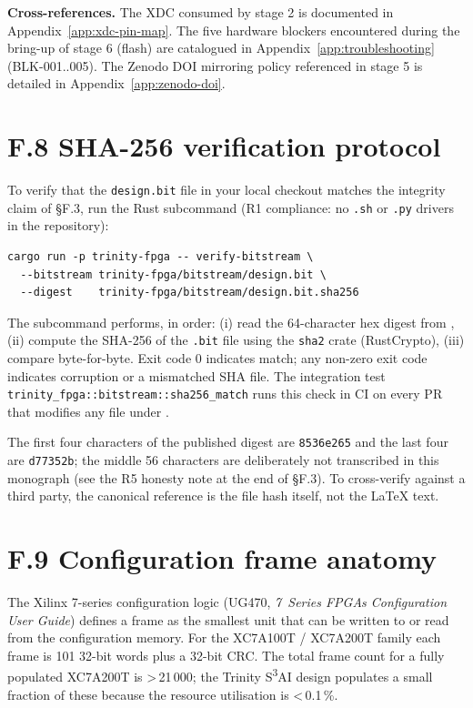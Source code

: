\textbf{Cross-references.}
The XDC consumed by stage 2 is documented in
Appendix~\ref{app:xdc-pin-map}. The five hardware blockers encountered
during the bring-up of stage 6 (flash) are catalogued in
Appendix~\ref{app:troubleshooting} (BLK-001..005). The Zenodo DOI
mirroring policy referenced in stage 5 is detailed in
Appendix~\ref{app:zenodo-doi}.

\section*{F.8 SHA-256 verification protocol}
\label{sec:appF-verify}

To verify that the \texttt{design.bit} file in your local checkout
matches the integrity claim of \S F.3, run the Rust subcommand
(R1 compliance: no \texttt{.sh} or \texttt{.py} drivers in the
repository):

\begin{verbatim}
cargo run -p trinity-fpga -- verify-bitstream \
  --bitstream trinity-fpga/bitstream/design.bit \
  --digest    trinity-fpga/bitstream/design.bit.sha256
\end{verbatim}

The subcommand performs, in order: (i) read the 64-character hex digest
from , (ii) compute the SHA-256 of the
\texttt{.bit} file using the \texttt{sha2} crate (RustCrypto), (iii)
compare byte-for-byte. Exit code 0 indicates match; any non-zero exit
code indicates corruption or a mismatched SHA file. The integration
test \texttt{trinity\_fpga::bitstream::sha256\_match} runs this check
in CI on every PR that modifies any file under
\filepath{trinity-fpga/bitstream/}.

The first four characters of the published digest are \texttt{8536e265}
and the last four are \texttt{d77352b}; the middle 56 characters are
deliberately not transcribed in this monograph (see the R5 honesty
note at the end of \S F.3). To cross-verify against a third party,
the canonical reference is the file hash itself, not the LaTeX text.

\section*{F.9 Configuration frame anatomy}
\label{sec:appF-frame}

The Xilinx 7-series configuration logic (UG470, \emph{7~Series FPGAs
Configuration User Guide}) defines a frame as the smallest unit that
can be written to or read from the configuration memory. For the
XC7A100T / XC7A200T family each frame is 101 32-bit words plus a
32-bit CRC. The total frame count for a fully populated XC7A200T is
\textgreater\,21\,000; the Trinity S\textsuperscript{3}AI design
populates a small fraction of these because the resource utilisation
is \textless\,0.1\,\%.

